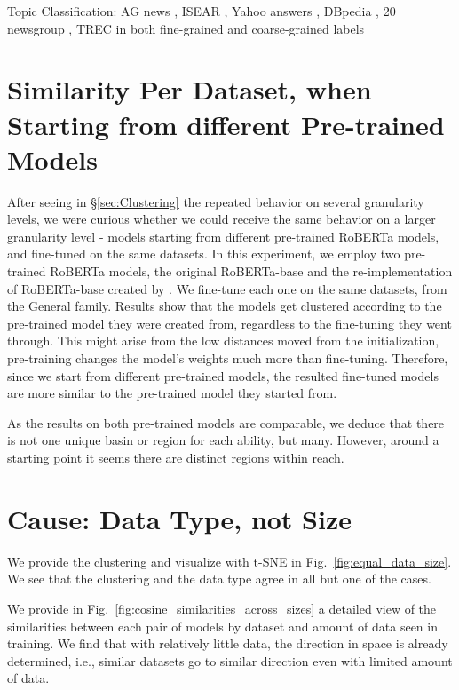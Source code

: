 \documentclass[nohyperref]{article}
\theoremstyle{plain}
\theoremstyle{definition}
\theoremstyle{remark}
\begin{document}
Topic Classification: AG news \citep{zhang2015character}, ISEAR \citep{scherer1994evidence}, Yahoo answers \citep{zhang2015character}, DBpedia \citep{zhang2015character}, 20 newsgroup \citep{zhang2015character}, TREC in both fine-grained and coarse-grained labels \citep[][]{li-roth-2002-learning}



\section{Similarity Per Dataset, when Starting from different Pre-trained Models}\label{ap:sec:roberta_vs_yanai}
After seeing in \S\ref{sec:Clustering} the repeated behavior on several granularity levels, we were curious whether we could receive the same behavior on a larger granularity level - models starting from different pre-trained RoBERTa models, and fine-tuned on the same datasets. 
In this experiment, we employ two pre-trained RoBERTa models, the original RoBERTa-base and the re-implementation of RoBERTa-base created by \citet{yanai_roberta}. We fine-tune each one on the same datasets, from the General family. Results show that the models get clustered according to the pre-trained model they were created from, regardless to the fine-tuning they went through. This might arise from the low distances moved from the initialization, pre-training changes the model's weights much more than fine-tuning. Therefore, since we start from different pre-trained models, the resulted fine-tuned models are more similar to the pre-trained model they started from. 

As the results on both pre-trained models are comparable, we deduce that there is not one unique basin or region for each ability, but many. However, around a starting point it seems there are distinct regions within reach. 



\section{Cause: Data Type, not Size}\label{ap:sec:data_amounts}
We provide the clustering and visualize with t-SNE in Fig.~\ref{fig:equal_data_size}. We see that the clustering and the data type agree in all but one of the cases.

We provide in Fig.~\ref{fig:cosine_similarities_across_sizes} a detailed view of the similarities between each pair of models by dataset and amount of data seen in training. We find that with relatively little data, the direction in space is already determined, i.e., similar datasets go to similar direction even with limited amount of data.
\end{document}
